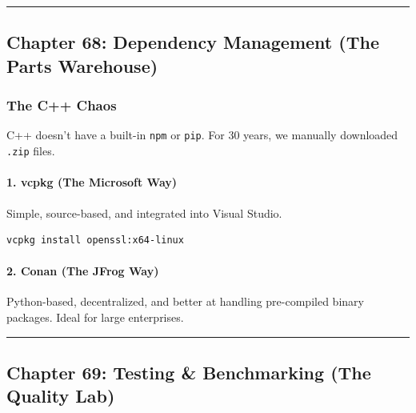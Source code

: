 \begin{center}\rule{0.5\linewidth}{0.5pt}\end{center}

\hypertarget{chapter-68-dependency-management-the-parts-warehouse}{%
\subsection{Chapter 68: Dependency Management (The Parts
Warehouse)}\label{chapter-68-dependency-management-the-parts-warehouse}}

\hypertarget{the-c-chaos}{%
\subsubsection{The C++ Chaos}\label{the-c-chaos}}

C++ doesn't have a built-in \passthrough{\lstinline!npm!} or
\passthrough{\lstinline!pip!}. For 30 years, we manually downloaded
\passthrough{\lstinline!.zip!} files.

\hypertarget{vcpkg-the-microsoft-way}{%
\paragraph{1. vcpkg (The Microsoft Way)}\label{vcpkg-the-microsoft-way}}

Simple, source-based, and integrated into Visual Studio.

\begin{lstlisting}[language=bash]
vcpkg install openssl:x64-linux
\end{lstlisting}

\hypertarget{conan-the-jfrog-way}{%
\paragraph{2. Conan (The JFrog Way)}\label{conan-the-jfrog-way}}

Python-based, decentralized, and better at handling pre-compiled binary
packages. Ideal for large enterprises.

\begin{center}\rule{0.5\linewidth}{0.5pt}\end{center}

\hypertarget{chapter-69-testing-benchmarking-the-quality-lab}{%
\subsection{Chapter 69: Testing \& Benchmarking (The Quality
Lab)}\label{chapter-69-testing-benchmarking-the-quality-lab}}

